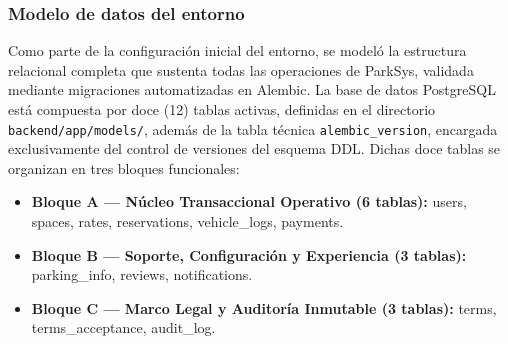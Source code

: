 \subsubsection{Modelo de datos del entorno}



Como parte de la configuración inicial del entorno, se modeló la estructura relacional completa que sustenta todas las operaciones de ParkSys, validada mediante migraciones automatizadas en Alembic. La base de datos PostgreSQL está compuesta por doce (12) tablas activas, definidas en el directorio \texttt{backend/app/models/}, además de la tabla técnica \texttt{alembic\_version}, encargada exclusivamente del control de versiones del esquema DDL. Dichas doce tablas se organizan en tres bloques funcionales:

\begin{itemize}
    \item \textbf{Bloque A — Núcleo Transaccional Operativo (6 tablas):} users, spaces, rates, reservations, vehicle\_logs, payments.
    \item \textbf{Bloque B — Soporte, Configuración y Experiencia (3 tablas):} parking\_info, reviews, notifications.
    \item \textbf{Bloque C — Marco Legal y Auditoría Inmutable (3 tablas):} terms, terms\_acceptance, audit\_log.
\end{itemize}

